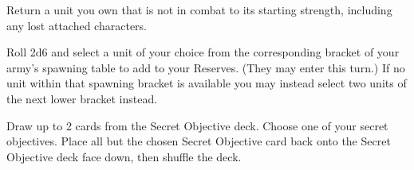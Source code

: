 \documentclass{HordeModeTarot}
\begin{document}

Return a unit you own that is not in combat to its starting strength, including any lost attached characters.


Roll 2d6 and select a unit of your choice from the corresponding bracket of your army's spawning table to add to your Reserves. (They may enter this turn.)  If no unit within that spawning bracket is available you may instead select two units of the next lower bracket instead.


Draw up to 2 cards from the Secret Objective deck.  Choose one of your secret objectives. Place all but the chosen Secret Objective card back onto the Secret Objective deck face down, then shuffle the deck.
\end{document}
